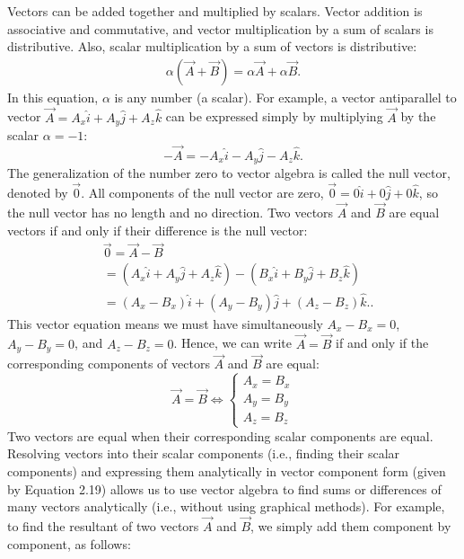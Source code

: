 \documentclass{report}
\begin{document}
    \pagebreak 
    \bigbreak \noindent 
    Vectors can be added together and multiplied by scalars. Vector addition is associative  and commutative, and vector multiplication by a sum of scalars is distributive. Also, scalar multiplication by a sum of vectors is distributive:
    \begin{align*}
        \alpha(\vec{A} + \vec{B}) = \alpha\vec{A} + \alpha\vec{B}
    .\end{align*}
    \bigbreak \noindent 
    In this equation, $\alpha$ is any number (a scalar). For example, a vector antiparallel to vector $\vec{A} = A_x\hat{i} + A_y\hat{j} + A_z\hat{k}$ can be expressed simply by multiplying $\vec{A}$ by the scalar $\alpha = -1$:
    \[
    -\vec{A}  = -A_x\hat{i} - A_y\hat{j} - A_z\hat{k}.
    \]
    \bigbreak \noindent 
    The generalization of the number zero to vector algebra is called the null vector, denoted by $\vec{0}$. All components of the null vector are zero, $\vec{0} = 0\hat{i} + 0\hat{j} + 0\hat{k}$, so the null vector has no length and no direction.
    \bigbreak \noindent 
    Two vectors $\vec{A}$ and $\vec{B}$ are equal vectors if and only if their difference is the null vector:
    \begin{align*}
        &\vec{0} = \vec{A} - \vec{B} \\
        &= (A_x\hat{i} + A_y\hat{j} + A_z\hat{k}) - (B_x\hat{i} + B_y\hat{j} + B_z\hat{k}) \\
        &= (A_x - B_x)\hat{i} + (A_y - B_y)\hat{j} + (A_z - B_z)\hat{k}.
    .\end{align*}
    This vector equation means we must have simultaneously $A_x - B_x = 0$, $A_y - B_y = 0$, and $A_z - B_z = 0$. Hence, we can write $\vec{A} = \vec{B}$ if and only if the corresponding components of vectors $\vec{A}$ and $\vec{B}$ are equal:
    \bigbreak \noindent 
       \begin{equation}
        \vec{A} = \vec{B} \iff
            \begin{cases}
                 A_{x} = B_{x} \\
                 A_{y} = B_{y} \\
                 A_{z} = B_{z} 
            \end{cases}
        \end{equation}
        \bigbreak \noindent 
        Two vectors are equal when their corresponding scalar components are equal.
        \bigbreak \noindent 
        Resolving vectors into their scalar components (i.e., finding their scalar components) and expressing them analytically in vector component form (given by Equation 2.19) allows us to use vector algebra to find sums or differences of many vectors analytically (i.e., without using graphical methods). For example, to find the resultant of two vectors $\vec{A}$ and $\vec{B}$, we simply add them component by component, as follows:
\end{document}
